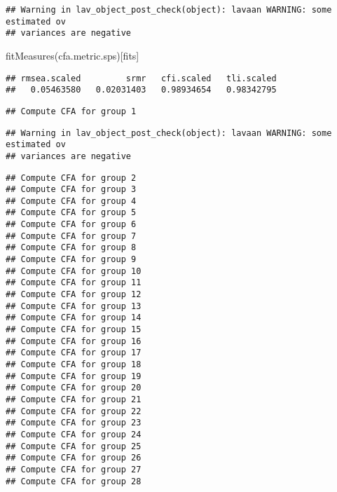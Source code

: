 \documentclass[
]{article}
\newenvironment{Shaded}{\begin{snugshade}}{\end{snugshade}}
\newcommand{\AttributeTok}[1]{\textcolor[rgb]{0.77,0.63,0.00}{#1}}
\newcommand{\CommentTok}[1]{\textcolor[rgb]{0.56,0.35,0.01}{\textit{#1}}}
\newcommand{\FunctionTok}[1]{\textcolor[rgb]{0.00,0.00,0.00}{#1}}
\newcommand{\NormalTok}[1]{#1}
\newcommand{\OtherTok}[1]{\textcolor[rgb]{0.56,0.35,0.01}{#1}}
\newcommand{\SpecialCharTok}[1]{\textcolor[rgb]{0.00,0.00,0.00}{#1}}
\begin{document}
\begin{verbatim}
## Warning in lav_object_post_check(object): lavaan WARNING: some estimated ov
## variances are negative
\end{verbatim}

\begin{Shaded}
\begin{Highlighting}[]
\FunctionTok{fitMeasures}\NormalTok{(cfa.metric.sps)[fits]}
\end{Highlighting}
\end{Shaded}

\begin{verbatim}
## rmsea.scaled         srmr   cfi.scaled   tli.scaled 
##   0.05463580   0.02031403   0.98934654   0.98342795
\end{verbatim}

\begin{Shaded}
\end{Shaded}

\begin{verbatim}
## Compute CFA for group 1
\end{verbatim}

\begin{verbatim}
## Warning in lav_object_post_check(object): lavaan WARNING: some estimated ov
## variances are negative
\end{verbatim}

\begin{verbatim}
## Compute CFA for group 2
## Compute CFA for group 3
## Compute CFA for group 4
## Compute CFA for group 5
## Compute CFA for group 6
## Compute CFA for group 7
## Compute CFA for group 8
## Compute CFA for group 9
## Compute CFA for group 10
## Compute CFA for group 11
## Compute CFA for group 12
## Compute CFA for group 13
## Compute CFA for group 14
## Compute CFA for group 15
## Compute CFA for group 16
## Compute CFA for group 17
## Compute CFA for group 18
## Compute CFA for group 19
## Compute CFA for group 20
## Compute CFA for group 21
## Compute CFA for group 22
## Compute CFA for group 23
## Compute CFA for group 24
## Compute CFA for group 25
## Compute CFA for group 26
## Compute CFA for group 27
## Compute CFA for group 28
\end{verbatim}
\end{document}
